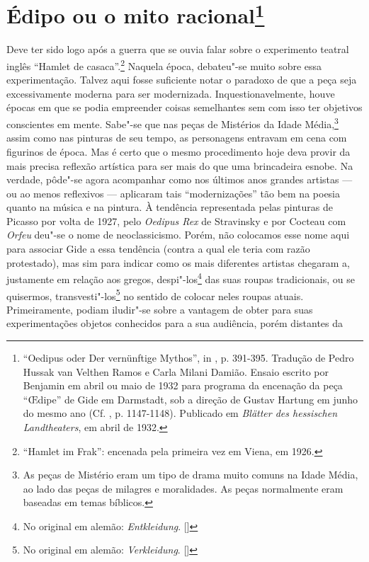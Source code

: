 \chapter{Édipo ou o mito racional\footnote[*]{``Oedipus oder Der vernünftige Mythos'', in , p. 391-395. Tradução de
  Pedro Hussak van Velthen Ramos e Carla Milani Damião. Ensaio escrito
  por Benjamin em abril ou maio de 1932 para programa da encenação da
  peça ``\OE dipe'' de Gide em Darmstadt, sob a direção de Gustav Hartung
  em junho do mesmo ano (Cf. , p. 1147-1148). Publicado em
  \emph{Blätter des hessischen Landtheaters}, em abril de 1932.}}

Deve ter sido logo após a guerra que se ouvia falar sobre o experimento
teatral inglês ``Hamlet de casaca''.\footnote{``Hamlet im Frak'':
  encenada pela primeira vez em Viena, em 1926. \versal{[N. E.]}} Naquela época,
debateu"-se muito sobre essa experimentação. Talvez aqui fosse suficiente
notar o paradoxo de que a peça seja excessivamente moderna para ser
modernizada. Inquestionavelmente, houve épocas em que se podia
empreender coisas semelhantes sem com isso ter objetivos conscientes em mente.
Sabe"-se que nas peças de Mistérios da Idade Média,\footnote{As peças de Mistério eram um tipo de drama muito comuns na Idade Média, ao lado das peças de milagres e moralidades. As peças normalmente eram baseadas em temas bíblicos.} assim como nas %
pinturas de seu tempo, as personagens entravam em cena com figurinos de
época. Mas é certo que o mesmo procedimento hoje deva provir da mais
precisa reflexão artística para ser mais do que uma brincadeira esnobe.
Na verdade, pôde"-se agora acompanhar como nos últimos anos grandes
artistas --- ou ao menos reflexivos --- aplicaram tais ``modernizações''
tão bem na poesia quanto na música e na pintura. À tendência
representada pelas pinturas de Picasso por volta de 1927, pelo
\emph{Oedipus Rex} de Stravinsky e por Cocteau com \emph{Orfeu} deu"-se o
nome de neoclassicismo. Porém, não colocamos esse nome aqui para
associar Gide a essa tendência (contra a qual ele teria com razão
protestado), mas sim para indicar como os mais diferentes artistas
chegaram a, justamente em relação aos gregos, despi"-los\footnote{No original em alemão: \emph{Entkleidung}. []} das suas roupas tradicionais, ou se quisermos, transvesti"-los\footnote{No original em alemão: \emph{Verkleidung}. []} no sentido de colocar neles roupas atuais.
Primeiramente, podiam iludir"-se sobre a vantagem de
obter para suas experimentações objetos conhecidos para a sua audiência, porém distantes da
